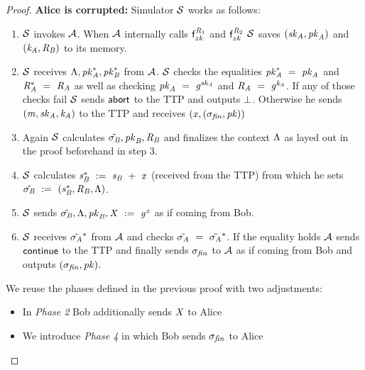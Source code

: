 \begin{proof}
    \textbf{Alice is corrupted: } Simulator $\mathcal{S}$ works as follows:
    \begin{enumerate}
        \item $\mathcal{S}$ invokes $\mathcal{A}$.
        When $\mathcal{A}$ internally calls $\mathsf{f}^{\mathit{R}_1}_{zk}$ and $\mathsf{f}^{\mathit{R}_2}_{zk}$ $\mathcal{S}$ saves $(\mathit{sk}_{\mathit{A}}, \mathit{pk}_{\mathit{A}})$ and $(\mathit{\mathit{k}_{\mathit{A}}}, \mathit{R}_{\mathit{B}})$ to its memory.
        \item $\mathcal{S}$ receives $\Lambda, \mathit{pk}_{\mathit{A}}^*, \mathit{pk}_{\mathit{B}}^*$ from $\mathcal{A}$.
        $\mathcal{S}$ checks the equalities $\mathit{pk}_{\mathit{A}}^* ~=~ \mathit{pk}_{\mathit{A}}$ and $\mathit{R}_{\mathit{A}}^* ~=~ \mathit{R}_{\mathit{A}}$ as well as checking $\mathit{pk}_{\mathit{A}} ~=~ \mathit{g}^{\mathit{sk}_{\mathit{A}}}$ and $\mathit{R}_{\mathit{A}} ~=~ \mathit{g}^{\mathit{\mathit{k}_{\mathit{A}}}}$.
        If any of those checks fail $\mathcal{S}$ sends $\mathsf{abort}$ to the TTP and outputs $\bot$.
        Otherwise he sends $(\mathit{m}, \mathit{sk}_{\mathit{A}}, \mathit{\mathit{k}_{\mathit{A}}})$ to the TTP and receives $(\mathit{x}, (\sigma_{\mathit{fin}}, \mathit{pk}))$
        \item Again $\mathcal{S}$ calculates $\tilde{\sigma_{\mathit{B}}}, \mathit{pk}_{\mathit{B}}, \mathit{R}_{\mathit{B}}$ and finalizes the context $\Lambda$ as layed out in the proof beforehand in step 3.
        \item $\mathcal{S}$ calculates $\mathit{s}_{\mathit{B}}^* ~:=~ \mathit{s}_{\mathit{B}} ~+~ \mathit{x}$ (received from the TTP) from which he sets $\hat{\sigma_{\mathit{B}}} ~:=~ (\mathit{s}_{\mathit{B}}^*, \mathit{R}_{\mathit{B}}, \Lambda)$.
        \item $\mathcal{S}$ sends $\hat{\sigma_{\mathit{B}}}, \Lambda, \mathit{pk}_{\mathit{B}}, \mathit{X} ~:=~ \mathit{g}^{\mathit{x}}$ as if coming from Bob.
        \item $\mathcal{S}$ receives $\tilde{\sigma_{\mathit{A}}}^*$ from $\mathcal{A}$ and checks $\tilde{\sigma_{\mathit{A}}} ~=~ \tilde{\sigma_{\mathit{A}}}^*$.
        If the equality holds $\mathcal{A}$ sends $\mathsf{continue}$ to the TTP and finally sends $\sigma_{\mathit{fin}}$ to $\mathcal{A}$ as if coming from Bob and outputs $(\sigma_{\mathit{fin}}, \mathit{pk})$.
    \end{enumerate}

    We reuse the phases defined in the previous proof with two adjustments:
    \begin{itemize}
        \item In \textit{Phase 2} Bob additionally sends $\mathit{X}$ to Alice
        \item We introduce \textit{Phase 4} in which Bob sends $\sigma_{\mathit{fin}}$ to Alice
    \end{itemize}


\end{proof}
